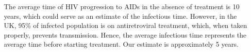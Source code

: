 \documentclass[a4paper,10pt]{article}
\begin{document}
The average time of HIV progression to AIDs in the absence of treatment is 10 years, which could serve as an estimate of the infectious time. However, in the UK, 95\% of infected population is on antiretroviral treatment, which, when taken properly, prevents transmission. Hence, the average infectious time represents the average time before starting treatment. Our estimate is approximately 5 years. 




\end{document}
